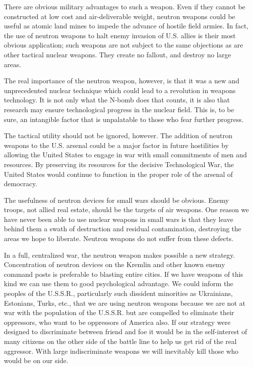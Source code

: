 There are obvious military advantages to such a weapon. Even if they cannot be constructed at low cost and air-deliverable weight, neutron weapons could be useful as atomic land mines to impede the advance of hostile field armies. In fact, the use of neutron weapons to halt enemy invasion of U.S. allies is their most obvious application; such weapons are not subject to the same objections as are other tactical nuclear weapons. They create no fallout, and destroy no large areas.

The real importance of the neutron weapon, however, is that it was a new and unprecedented nuclear technique which could lead to a revolution in weapons technology. It is not only what the N-bomb does that counts, it is also that research may ensure technological progress in the nuclear field. This is, to be sure, an intangible factor that is unpalatable to those who fear further progress.

The tactical utility should not be ignored, however. The addition of neutron weapons to the U.S. arsenal could be a major factor in future hostilities by allowing the United States to engage in war with small commitments of men and resources. By preserving its resources for the decisive Technological War, the United States would continue to function in the proper role of the arsenal of democracy.

The usefulness of neutron devices for small wars should be obvious. Enemy troops, not allied real estate, should be the targets of air weapons. One reason we have never been able to use nuclear weapons in small wars is that they leave behind them a swath of destruction and residual contamination, destroying the areas we hope to liberate. Neutron weapons do not suffer from these defects.

In a full, centralized war, the neutron weapon makes possible a new strategy. Concentration of neutron devices on the Kremlin and other known enemy command posts is preferable to blasting entire cities. If we have weapons of this kind we can use them to good psychological advantage. We could inform the peoples of the U.S.S.R., particularly such dissident minorities as Ukrainians, Estonians, Turks, etc., that we are using neutron weapons because we are not at war with the population of the U.S.S.R. but are compelled to eliminate their oppressors, who want to be oppressors of America also. If our strategy were designed to discriminate between friend and foe it would be in the self-interest of many citizens on the other side of the battle line to help us get rid of the real aggressor. With large indiscriminate weapons we will inevitably kill those who would be on our side.

